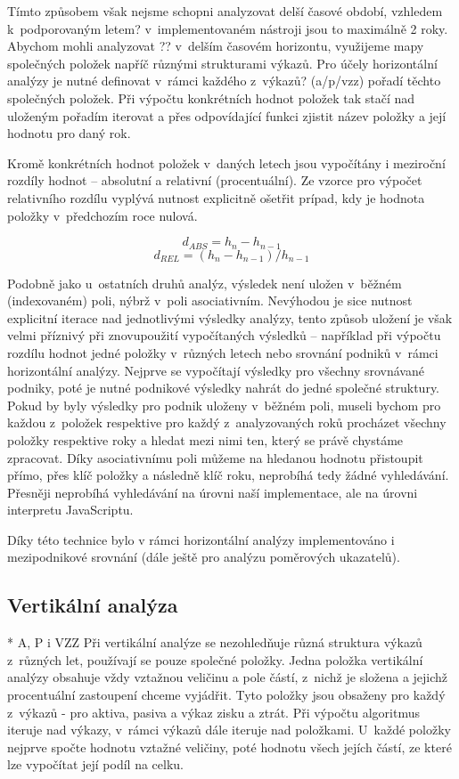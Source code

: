 Tímto způsobem však nejsme schopni analyzovat delší časové období, vzhledem k~podporovaným letem? v~implementovaném nástroji jsou to maximálně 2 roky. Abychom mohli analyzovat ?? v~delším časovém horizontu, využijeme mapy společných položek napříč různými strukturami výkazů. Pro účely horizontální analýzy je nutné definovat v~rámci každého z~výkazů? (a/p/vzz) pořadí těchto společných položek. Při výpočtu konkrétních hodnot položek tak stačí nad uloženým pořadím iterovat a přes odpovídající funkci zjistit název položky a její hodnotu pro daný rok.

Kromě konkrétních hodnot položek v~daných letech jsou vypočítány i meziroční rozdíly hodnot -- absolutní a relativní (procentuální). Ze vzorce pro výpočet relativního rozdílu vyplývá nutnost explicitně ošetřit prípad, kdy je hodnota položky v~předchozím roce nulová.

$$d_{ABS}=h_{n}-h_{n-1}$$
$$d_{REL}=(h_{n}-h_{n-1})/h_{n-1}$$


Podobně jako u~ostatních druhů analýz, výsledek není uložen v~běžném (indexovaném) poli, nýbrž v~poli asociativním. Nevýhodou je sice nutnost explicitní iterace nad jednotlivými výsledky analýzy, tento způsob uložení je však velmi příznivý při znovupoužití vypočítaných výsledků -- například při výpočtu rozdílu hodnot jedné položky v~různých letech nebo srovnání podniků v~rámci horizontální analýzy. Nejprve se vypočítají výsledky pro všechny srovnávané podniky, poté je nutné podnikové výsledky nahrát do jedné společné struktury. Pokud by byly výsledky pro podnik uloženy v~běžném poli, museli bychom pro každou z~položek respektive pro každý z~analyzovaných roků procházet všechny položky respektive roky a hledat mezi nimi ten, který se právě chystáme zpracovat. Díky asociativnímu poli můžeme na hledanou hodnotu přistoupit přímo, přes klíč položky a následně klíč roku, neprobíhá tedy žádné vyhledávání. Přesněji neprobíhá vyhledávání na úrovni naší implementace, ale na úrovni interpretu JavaScriptu.

Díky této technice bylo v rámci horizontální analýzy implementováno i mezipodnikové srovnání (dále ještě pro analýzu poměrových ukazatelů).

\subsection{Vertikální analýza}
* A, P i VZZ
Při vertikální analýze se nezohledňuje různá struktura výkazů z~různých let, používají se pouze společné položky. Jedna položka vertikální analýzy obsahuje vždy vztažnou veličinu a pole částí, z~nichž je složena a jejichž procentuální zastoupení chceme vyjádřit. Tyto položky jsou obsaženy pro každý z~výkazů - pro aktiva, pasiva a výkaz zisku a ztrát. Při výpočtu algoritmus iteruje nad výkazy, v~rámci výkazů dále iteruje nad položkami. U~každé položky nejprve spočte hodnotu vztažné veličiny, poté hodnotu všech jejích částí, ze které lze vypočítat její podíl na celku.

